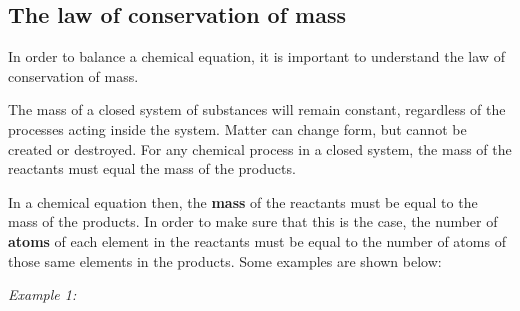             \subsection*{The law of conservation of mass}
            \nopagebreak
        \label{m38726*id63198}In order to balance a chemical equation, it is important to understand the law of conservation of mass.\par 
\label{m38726*fhsst!!!underscore!!!id145}
 { \label{m38726*meaningfhsst!!!underscore!!!id145}
        \label{m38726*id63208}The mass of a closed system of substances will remain constant, regardless of the processes acting inside the system. Matter can change form, but cannot be created or destroyed. For any chemical process in a closed system, the mass of the reactants must equal the mass of the products. \par 
         } 
        \label{m38726*id63221}In a chemical equation then, the \textbf{mass} of the reactants must be equal to the mass of the products. In order to make sure that this is the case, the number of \textbf{atoms} of each element in the reactants must be equal to the number of atoms of those same elements in the products. Some examples are shown below:\par 
        \label{m38726*id63238}
          \textsl{Example 1:}
        \label{m38726*id63246}\nopagebreak\noindent{}
          
